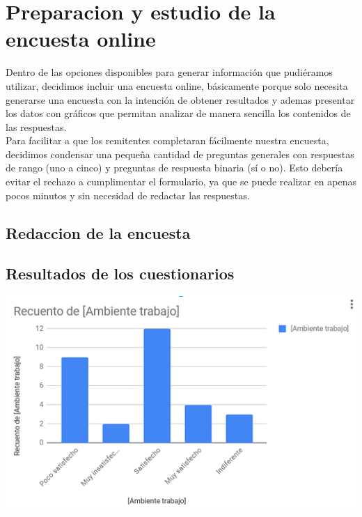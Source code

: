 \documentclass[12pt]{article}
\begin{document}
\section{Preparacion y estudio de la encuesta online}

	Dentro de las opciones disponibles para generar información que pudiéramos utilizar, decidimos incluir una encuesta online, básicamente porque solo necesita generarse una encuesta con la intención de obtener resultados y ademas presentar los datos con gráficos que permitan analizar de manera sencilla los contenidos de las respuestas.\\
	
	Para facilitar a que los remitentes completaran fácilmente nuestra encuesta, decidimos condensar una pequeña cantidad de preguntas generales con respuestas de rango (uno a cinco) y preguntas de respuesta binaria (sí o no). Esto debería evitar el rechazo a cumplimentar el formulario, ya que se puede realizar en apenas pocos minutos y sin necesidad de redactar las respuestas.
	

\subsection{Redaccion de la encuesta}



\subsection{Resultados de los cuestionarios}
\begin{center}
	\centering
	\includegraphics[width=1\textwidth]{graficoambiente}
\end{center}
\end{document}
